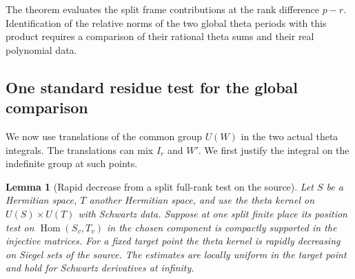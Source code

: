 \documentclass[a4paper,11pt]{article}
\newtheorem{lemma}[proposition]{Lemma}
\theoremstyle{definition}
\theoremstyle{remark}
\numberwithin{equation}{section}
\begin{document}
The theorem evaluates the split frame contributions at the
rank difference \(p-r\). Identification of the relative
norms of the two global theta periods with this product
requires a comparison of their rational theta sums and
their real polynomial data.
\clearpage

\subsection{One standard residue test for the global comparison}
\label{sec:thirdstandard837}
We now use translations of the common group \(U(W)\) in
the two actual theta integrals. The translations can mix
\(I_r\) and \(W'\). We first justify the integral on the
indefinite group at such points.

\begin{lemma}[Rapid decrease from a split full-rank test on the source]
\leavevmode\label{lem:rankdecay837}
Let \(S\) be a Hermitian space, \(T\) another Hermitian space,
and use the theta kernel on \(U(S)\times U(T)\) with Schwartz
data. Suppose at one split finite place its position test on
\(\operatorname{Hom}(S_v,T_v)\) in the chosen component is
compactly supported in the injective matrices. For a fixed
target point the theta kernel is rapidly decreasing on Siegel
sets of the source. The estimates are locally uniform in the
target point and hold for Schwartz derivatives at infinity.
\end{lemma}
\end{document}
